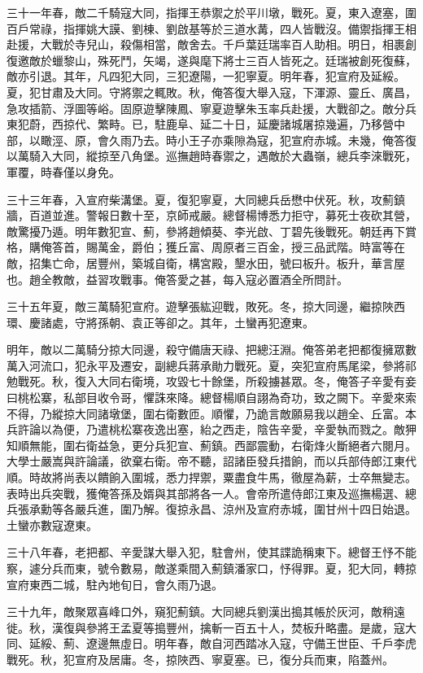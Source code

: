 \begin{pinyinscope}
三十一年春，敵二千騎寇大同，指揮王恭禦之於平川墩，戰死。夏，東入遼塞，圍百戶常祿，指揮姚大謨、劉棟、劉啟基等於三道水冓，四人皆戰沒。備禦指揮王相赴援，大戰於寺兒山，殺傷相當，敵舍去。千戶葉廷瑞率百人助相。明日，相裹創復邀敵於蠟黎山，殊死鬥，矢竭，遂與麾下將士三百人皆死之。廷瑞被創死復蘇，敵亦引退。其年，凡四犯大同，三犯遼陽，一犯寧夏。明年春，犯宣府及延綏。夏，犯甘肅及大同。守將禦之輒敗。秋，俺答復大舉入寇，下渾源、靈丘、廣昌，急攻插箭、浮圖等峪。固原遊擊陳鳳、寧夏遊擊朱玉率兵赴援，大戰卻之。敵分兵東犯蔚，西掠代、繁畤。已，駐鹿阜、延二十日，延慶諸城屠掠幾遍，乃移營中部，以瞰涇、原，會久雨乃去。時小王子亦乘隙為寇，犯宣府赤城。未幾，俺答復以萬騎入大同，縱掠至八角堡。巡撫趙時春禦之，遇敵於大蟲嶺，總兵李淶戰死，軍覆，時春僅以身免。

三十三年春，入宣府柴溝堡。夏，復犯寧夏，大同總兵岳懋中伏死。秋，攻薊鎮牆，百道並進。警報日數十至，京師戒嚴。總督楊博悉力拒守，募死士夜砍其營，敵驚擾乃遁。明年數犯宣、薊，參將趙傾葵、李光啟、丁碧先後戰死。朝廷再下賞格，購俺答首，賜萬金，爵伯；獲丘富、周原者三百金，授三品武階。時富等在敵，招集亡命，居豐州，築城自衛，構宮殿，墾水田，號曰板升。板升，華言屋也。趙全教敵，益習攻戰事。俺答愛之甚，每入寇必置酒全所問計。

三十五年夏，敵三萬騎犯宣府。遊擊張紘迎戰，敗死。冬，掠大同邊，繼掠陜西環、慶諸處，守將孫朝、袁正等卻之。其年，土蠻再犯遼東。

明年，敵以二萬騎分掠大同邊，殺守備唐天祿、把總汪淵。俺答弟老把都復擁眾數萬入河流口，犯永平及遷安，副總兵蔣承勛力戰死。夏，突犯宣府馬尾梁，參將祁勉戰死。秋，復入大同右衛境，攻毀七十餘堡，所殺擄甚眾。冬，俺答子辛愛有妾曰桃松寨，私部目收令哥，懼誅來降。總督楊順自詡為奇功，致之闕下。辛愛來索不得，乃縱掠大同諸墩堡，圍右衛數匝。順懼，乃詭言敵願易我以趙全、丘富。本兵許論以為便，乃遣桃松寨夜逸出塞，紿之西走，陰告辛愛，辛愛執而戮之。敵狎知順無能，圍右衛益急，更分兵犯宣、薊鎮。西鄙震動，右衛烽火斷絕者六閱月。大學士嚴嵩與許論議，欲棄右衛。帝不聽，詔諸臣發兵措餉，而以兵部侍郎江東代順。時故將尚表以饋餉入圍城，悉力捍禦，粟盡食牛馬，徹屋為薪，士卒無變志。表時出兵突戰，獲俺答孫及婿與其部將各一人。會帝所遣侍郎江東及巡撫楊選、總兵張承勳等各嚴兵進，圍乃解。復掠永昌、涼州及宣府赤城，圍甘州十四日始退。土蠻亦數寇遼東。

三十八年春，老把都、辛愛謀大舉入犯，駐會州，使其諜詭稱東下。總督王忬不能察，遽分兵而東，號令數易，敵遂乘間入薊鎮潘家口，忬得罪。夏，犯大同，轉掠宣府東西二城，駐內地旬日，會久雨乃退。

三十九年，敵聚眾喜峰口外，窺犯薊鎮。大同總兵劉漢出搗其帳於灰河，敵稍遠徙。秋，漢復與參將王孟夏等搗豐州，擒斬一百五十人，焚板升略盡。是歲，寇大同、延綏、薊、遼邊無虛日。明年春，敵自河西踏冰入寇，守備王世臣、千戶李虎戰死。秋，犯宣府及居庸。冬，掠陜西、寧夏塞。已，復分兵而東，陷蓋州。


\end{pinyinscope}
